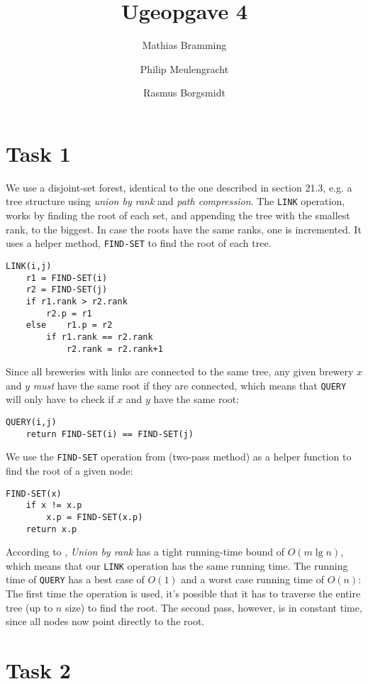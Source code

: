\documentclass[paper=a4, fleqn]{article}
\title{Ugeopgave 4}
\author{Mathias Bramming \and Philip Meulengracht \and Rasmus Borgsmidt}
\date{}
\newcommand{\clrs}{\textsmaller{CLRS}\xspace}
\begin{document}
\maketitle
\section*{Task 1} 

We use a disjoint-set forest, identical to the one described in \clrs section
21.3, e.g. a tree structure using \emph{union by rank} and \emph{path
  compression}. The {\tt LINK} operation, works by finding the root of each set,
and appending the tree with the smallest rank, to the biggest. In case the roots
have the same ranks, one is incremented. It uses a helper method,
{\tt FIND-SET} to find the root of each tree.

\begin{lstlisting}
LINK(i,j)
	r1 = FIND-SET(i)
	r2 = FIND-SET(j)
	if r1.rank > r2.rank
		r2.p = r1
	else 	r1.p = r2
		if r1.rank == r2.rank
			r2.rank = r2.rank+1
\end{lstlisting}

Since all breweries with links are connected to the same tree, any given brewery
$x$ and $y$ \emph{must} have the same root if they are connected, which means
that {\tt QUERY} will only have to check if $x$ and $y$ have the same root:

\begin{lstlisting}
QUERY(i,j)
	return FIND-SET(i) == FIND-SET(j)
\end{lstlisting}

We use the {\tt FIND-SET} operation from \clrs (two-pass method) as a helper
function to find the root of a given node:

\begin{lstlisting}
FIND-SET(x)
	if x != x.p
		x.p = FIND-SET(x.p)
	return x.p
\end{lstlisting}

According to \clrs, \emph{Union by rank} has a tight running-time bound of $O(m
\lg n)$, which means that our {\tt LINK} operation has the same running
time. The running time of {\tt QUERY} has a best case of $O(1)$ and a worst
case running time of $O(n)$: The first time the operation is used, it's possible
that it has to traverse the entire tree (up to $n$ size) to find the root. The
second pass, however, is in constant time, since all nodes now point directly to
the root.

\section*{Task 2}
\end{document}
